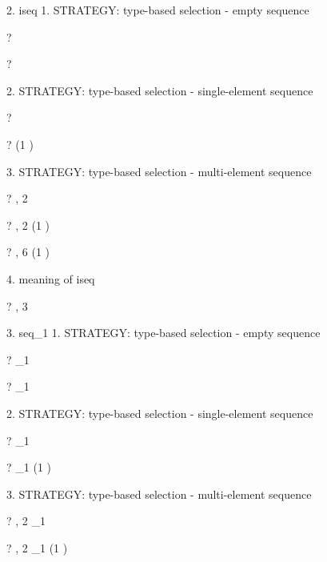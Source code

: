 \documentclass{article}
\begin{document}
 2. iseq
     1. STRATEGY: type-based selection - empty sequence
\begin{zed} \vdash? \langle \rangle \infix \iseq \nat \end{zed}
\begin{zed} \vdash? \langle \rangle \infix \iseq \langle \rangle \end{zed}
     2. STRATEGY: type-based selection - single-element sequence
\begin{zed} \vdash?  \rangle \infix \iseq \nat \end{zed}
\begin{zed} \vdash?  \rangle \infix \iseq (1 ) \end{zed}
     3. STRATEGY: type-based selection - multi-element sequence
\begin{zed} \vdash? , 2 \rangle \infix \iseq \nat \end{zed}
\begin{zed} \vdash? , 2 \rangle \infix \iseq (1 ) \end{zed}
\begin{zed} \vdash? , 6 \rangle \notin \iseq (1 ) \end{zed}
     4. meaning of iseq
\begin{zed} \vdash? , 3 \rangle \notin \iseq \nat \end{zed}

 3. seq_1
     1. STRATEGY: type-based selection - empty sequence
\begin{zed} \vdash? \langle \rangle \notin \seq_1 \nat \end{zed}
\begin{zed} \vdash? \langle \rangle \notin \seq_1 \langle \rangle \end{zed}
     2. STRATEGY: type-based selection - single-element sequence
\begin{zed} \vdash?  \rangle \infix \seq_1 \nat \end{zed}
\begin{zed} \vdash?  \rangle \infix \seq_1 (1 ) \end{zed}
     3. STRATEGY: type-based selection - multi-element sequence
\begin{zed} \vdash? , 2 \rangle \infix \seq_1 \nat \end{zed}
\begin{zed} \vdash? , 2 \rangle \infix \seq_1 (1 ) \end{zed}
\end{document}

